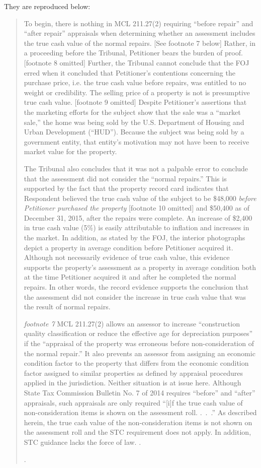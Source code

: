 They are reproduced below:

\begin{quotation}
To begin, there is nothing in MCL 211.27(2) requiring ``before repair'' and ``after repair'' appraisals when determining whether an assessment includes the true cash value of the normal repairs. [See footnote 7 below] Rather, in a proceeding before the Tribunal, Petitioner bears the burden of proof. [footnote 8 omitted] Further, the Tribunal cannot conclude that the FOJ erred when it concluded that Petitioner's contentions concerning the purchase price, i.e. the true cash value before repairs, was entitled to no weight or credibility. The selling price of a property is not is presumptive true cash value. [footnote 9 omitted] Despite Petitioner's assertions that the marketing efforts for the subject show that the sale was a ``market sale,'' the home was being sold by the U.S. Department of Housing and Urban Development (``HUD''). Because the subject was being sold by a government entity, that entity's motivation may not have been to receive market value for the property.

The Tribunal also concludes that it was not a palpable error to conclude that the assessment did not consider the ``normal repairs.'' This is supported by the fact that the property record card indicates that Respondent believed the true cash value of the subject to be \$48,000 \textit{before Petitioner purchased the property} [footnote 10 omitted] and \$50,400 as of December 31, 2015, after the repairs were complete. An increase of \$2,400 in true cash value (5\%) is easily attributable to inflation and increases in the market. In addition, as stated by the FOJ, the interior photographs depict a property in average condition before Petitioner acquired it. Although not necessarily evidence of true cash value, this evidence supports the property's assessment as a property in average condition both at the time Petitioner acquired it and after he completed the normal repairs. In other words, the record evidence supports the conclusion that the assessment did not consider the increase in true cash value that was the result of normal repairs.

\textit{footnote 7} MCL 211.27(2) allows an assessor to increase ``construction quality classification or reduce the effective age for depreciation purposes'' if the ``appraisal of the property was erroneous before non-consideration of the normal repair.'' It also prevents an assessor from assigning an economic condition factor to the property that differs from the economic condition factor assigned to similar properties as defined by appraisal procedures applied in the jurisdiction. Neither situation is at issue here. Although State Tax Commission Bulletin No. 7 of 2014 requires ``before'' and ``after'' appraisals, such appraisals are only required ``[i]f the true cash value of non-consideration items is shown on the assessment roll. .~.~.'' As described herein, the true cash value of the non-consideration items is not shown on the assessment roll and the STC requirement does not apply. In addition, STC guidance lacks the force of law. .

\reconsiderationDenied[2].
\end{quotation}

